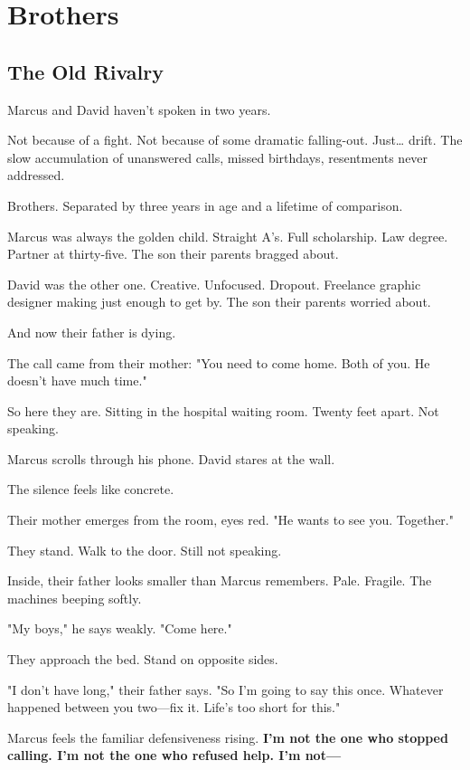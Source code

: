 \documentclass[11pt,twoside]{book}
\begin{document}
\chapter{Brothers}

\section*{The Old Rivalry}

Marcus and David haven't spoken in two years.

Not because of a fight. Not because of some dramatic falling-out. Just\ldots{} drift. The slow accumulation of unanswered calls, missed birthdays, resentments never addressed.

Brothers. Separated by three years in age and a lifetime of comparison.

Marcus was always the golden child. Straight A's. Full scholarship. Law degree. Partner at thirty-five. The son their parents bragged about.

David was the other one. Creative. Unfocused. Dropout. Freelance graphic designer making just enough to get by. The son their parents worried about.

And now their father is dying.

The call came from their mother: "You need to come home. Both of you. He doesn't have much time."

So here they are. Sitting in the hospital waiting room. Twenty feet apart. Not speaking.

Marcus scrolls through his phone. David stares at the wall.

The silence feels like concrete.

Their mother emerges from the room, eyes red. "He wants to see you. Together."

They stand. Walk to the door. Still not speaking.

Inside, their father looks smaller than Marcus remembers. Pale. Fragile. The machines beeping softly.

"My boys," he says weakly. "Come here."

They approach the bed. Stand on opposite sides.

"I don't have long," their father says. "So I'm going to say this once. Whatever happened between you two—fix it. Life's too short for this."

Marcus feels the familiar defensiveness rising. \textbf{I'm not the one who stopped calling. I'm not the one who refused help. I'm not—}
\end{document}
